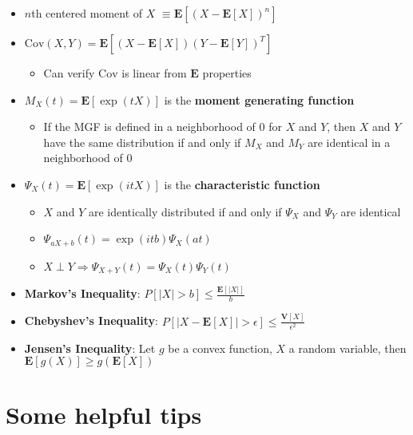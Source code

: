 \documentclass[12pt,english]{article}
\begin{document}
\begin{itemize}
	\item $n$th centered moment of $X$ $\equiv \mathbf{E}[(X - \mathbf{E}[X])^{n}]$
	\item $\text{Cov}(X, Y) = \mathbf{E}[(X - \mathbf{E}[X])(Y - \mathbf{E}[Y])^{T}]$
	\begin{itemize}
		\item Can verify $\text{Cov}$ is linear from $\mathbf{E}$ properties
	\end{itemize}
	\item $M_{X}(t) = \mathbf{E}[\exp(tX)]$ is the \textbf{moment generating function}
	\begin{itemize}
		\item If the MGF is defined in a neighborhood of 0 for $X$ and $Y$, then $X$ and $Y$ have the same distribution if and only if $M_{X}$ and $M_{Y}$ are identical in a neighborhood of 0
	\end{itemize}
	\item $\Psi_{X}(t) = \mathbf{E}[\exp(itX)]$ is the \textbf{characteristic function}
	\begin{itemize}
		\item $X$ and $Y$ are identically distributed if and only if $\Psi_{X}$ and $\Psi_{Y}$ are identical
		\item $\Psi_{aX + b}(t) = \exp(itb) \Psi_{X}(at)$
		\item $X \perp Y \Rightarrow \Psi_{X + Y}(t) = \Psi_{X}(t) \Psi_{Y}(t)$
	\end{itemize}
	\item \textbf{Markov's Inequality}: $P[|X| > b] \leq \frac{\mathbf{E}[|X|]}{b}$
	\item \textbf{Chebyshev's Inequality}: $P[|X - \mathbf{E}[X]| > \epsilon] \leq \frac{\mathbf{V}[X]}{\epsilon^{2}}$
	\item \textbf{Jensen's Inequality}: Let $g$ be a convex function, $X$ a random variable, then $\mathbf{E}[g(X)] \geq g(\mathbf{E}[X])$
\end{itemize}

\section{Some helpful tips}
\end{document}
